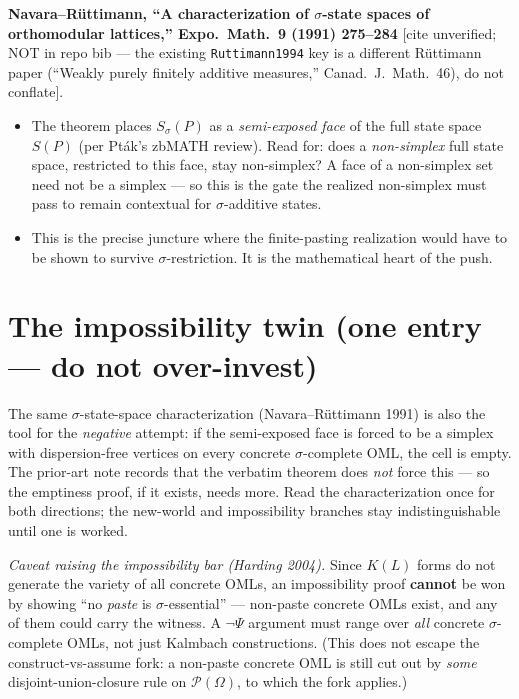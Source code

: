 \documentclass[11pt]{article}
\begin{document}
\noindent\textbf{Navara--R\"uttimann, ``A characterization of $\sigma$-state spaces of
orthomodular lattices,'' Expo.\ Math.\ 9 (1991) 275--284} \textup{[cite unverified; NOT
in repo bib --- the existing \texttt{Ruttimann1994} key is a different R\"uttimann paper
(``Weakly purely finitely additive measures,'' Canad.\ J.\ Math.\ 46), do not conflate]}.
\begin{itemize}[leftmargin=*]
  \item The theorem places $S_\sigma(P)$ as a \emph{semi-exposed face} of the full state
    space $S(P)$ (per Pt\'ak's zbMATH review). Read for: does a \emph{non-simplex} full
    state space, restricted to this face, stay non-simplex? A face of a non-simplex set
    need not be a simplex --- so this is the gate the realized non-simplex must pass to
    remain contextual for \emph{$\sigma$}-additive states.
  \item This is the precise juncture where the finite-pasting realization would have to be
    shown to survive $\sigma$-restriction. It is the mathematical heart of the push.
\end{itemize}

\section{The impossibility twin (one entry --- do not over-invest)}

\noindent The same $\sigma$-state-space characterization
(Navara--R\"uttimann 1991) is also the tool for the \emph{negative}
attempt: if the semi-exposed face is forced to be a simplex with dispersion-free
vertices on every concrete $\sigma$-complete OML, the cell is empty. The prior-art note
records that the verbatim theorem does \emph{not} force this --- so the emptiness proof,
if it exists, needs more. Read the characterization once for both directions; the
new-world and impossibility branches stay indistinguishable until one is worked.

\medskip
\noindent\emph{Caveat raising the impossibility bar (Harding 2004).} Since $K(L)$ forms
do not generate the variety of all concrete OMLs, an impossibility proof \textbf{cannot}
be won by showing ``no \emph{paste} is $\sigma$-essential'' --- non-paste concrete OMLs
exist, and any of them could carry the witness. A $\neg\Psi$ argument must range over
\emph{all} concrete $\sigma$-complete OMLs, not just Kalmbach constructions. (This does
not escape the construct-vs-assume fork: a non-paste concrete OML is still cut out by
\emph{some} disjoint-union-closure rule on $\mathcal{P}(\Omega)$, to which the fork
applies.)
\end{document}
